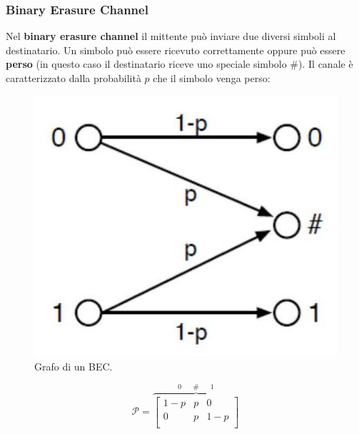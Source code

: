 \subsubsection{Binary Erasure Channel}
Nel \textbf{binary erasure channel} il mittente può inviare due diversi simboli al destinatario. Un simbolo può essere ricevuto correttamente oppure pu\`o essere \textbf{perso} (in questo caso il destinatario riceve uno speciale simbolo \#). Il canale \`e caratterizzato dalla probabilit\`a $p$ che il simbolo venga perso:

\begin{minipage}{0.45\textwidth}
\begin{figure}[H]
    \centering
    \includegraphics[scale=0.2]{img/erasure.jpg}
    \caption{Grafo di un BEC.}
\end{figure}
\end{minipage}
\begin{minipage}{0.45\textwidth}

\begin{equation*}
    \mathcal{P} = \overbrace{\begin{bmatrix}
    1-p & p & 0 \\
    0 & p & 1-p \\
    \end{bmatrix}}^{0 \hspace{20pt} \# \hspace{20pt} 1}
\end{equation*}
\end{minipage}

